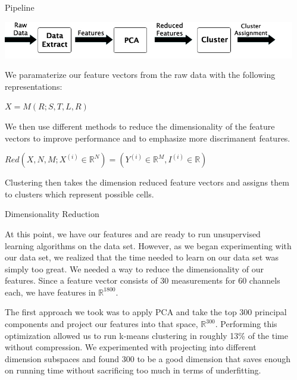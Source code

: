 \documentclass[final,t]{beamer}
\begin{document}
\begin{frame}{}
\begin{columns}[t]
\begin{column}{.3\linewidth}

    \end{column}
    \begin{column}{.3\linewidth}
      



      \begin{block}{Pipeline}
        \begin{center}
          \includegraphics[width=0.8\linewidth]{images/pipeline.jpg}
        \end{center}
        
        We paramaterize our feature vectors from the raw data with the following representations:
        \begin{center}
          $X = M(R; S,T,L,R)$ 
        \end{center}
        \break
        We then use different methods to reduce the dimensionality of
        the feature vectors to improve performance and to emphasize
        more discrimanent features.
        \break
        \begin{center}
        $Red(X,N,M; X^{(i)} \in \mathbb{R}^N) = (Y^{(i)} \in
        \mathbb{R}^M,I^{(i)} \in \mathbb{R})$ 
        \break
        \end{center}
        Clustering then takes the dimension reduced feature vectors
        and assigns them to clusters which represent possible cells.
        
     \end{block}
     
     \begin{block}{Dimensionality Reduction}
       \par
       
At this point, we have our features and are ready to run unsupervised
learning algorithms on the data set. However, as we began experimenting
with our data set, we realized that the time needed to learn on our data
set was simply too great. We needed a way to reduce the dimensionality of
our features. Since a feature vector consists of 30 measurements for 60
channels each, we have features in $\mathbb{R}^{1800}$.

The first approach we took was to apply PCA and take the top 300 principal
components and project our features into that space, $\mathbb{R}^{300}$.
Performing this optimization allowed us to run k-means clustering in
roughly 13\% of the time without compression. We experimented with
projecting into different dimension subspaces and found 300 to be a good
dimension that saves enough on running time without sacrificing too much
in terms of underfitting.


\end{block}
\end{column}
\end{columns}
\end{frame}
\end{document}

